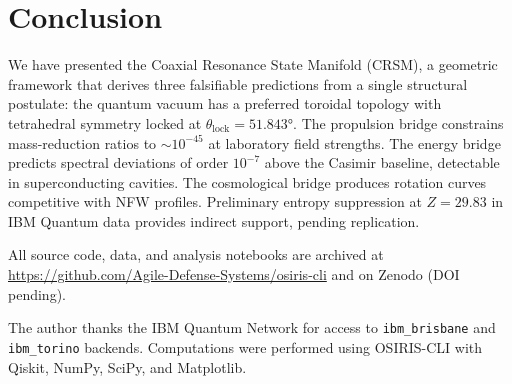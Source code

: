 \documentclass[aps,preprint,superscriptaddress,longbibliography]{revtex4-2}
\begin{document}
\section{Conclusion}
\label{sec:conclusion}

We have presented the Coaxial Resonance State Manifold (CRSM), a
geometric framework that derives three falsifiable predictions from
a single structural postulate: the quantum vacuum has a preferred
toroidal topology with tetrahedral symmetry locked at
$\theta_{\mathrm{lock}} = \ang{51.843}$.  The propulsion bridge
constrains mass-reduction ratios to $\sim\!10^{-45}$ at laboratory
field strengths.  The energy bridge predicts spectral deviations of
order $10^{-7}$ above the Casimir baseline, detectable in
superconducting cavities.  The cosmological bridge produces
rotation curves competitive with NFW profiles.  Preliminary entropy
suppression at $Z = 29.83$ in IBM Quantum data provides indirect
support, pending replication.

All source code, data, and analysis notebooks are archived at
\url{https://github.com/Agile-Defense-Systems/osiris-cli} and on
Zenodo (DOI pending).

\begin{acknowledgments}
The author thanks the IBM Quantum Network for access to
\texttt{ibm\_brisbane} and \texttt{ibm\_torino} backends.
Computations were performed using OSIRIS-CLI with Qiskit, NumPy,
SciPy, and Matplotlib.
\end{acknowledgments}
\end{document}
